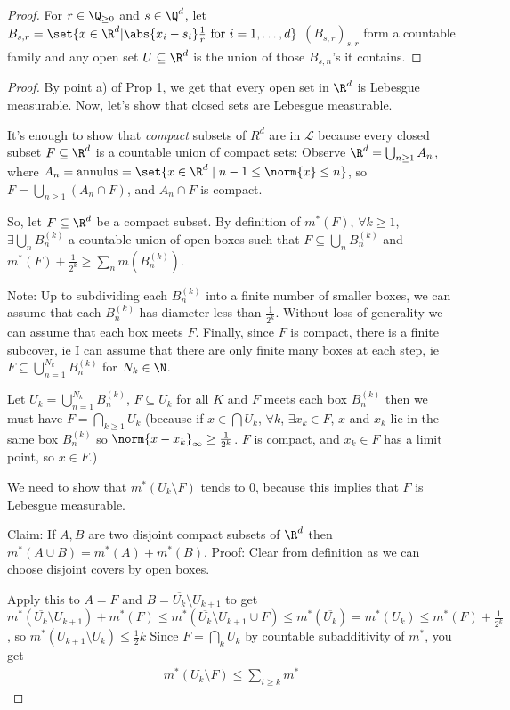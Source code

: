 \documentclass{article}
\newcommand{\1}[1]{\mathbbm{1}_{#1}}
\begin{document}
\begin{proof}
    For $r \in \Q_{\geq 0}$ and $s \in \Q^d$, let $B_{s, r} = \set{x \in \R^d | \abs{x_i - s_i} \frac1r \ \text{for} \ i=1,\dotsc,d}$
    $(B_{s,r})_{s,r}$ form a countable family and any open set $U \subseteq \R^d$ is the union of those $B_{s,n}$'s it contains.
\end{proof}

\begin{proof} %
    By point a) of Prop 1, we get that every open set in $\R^d$ is Lebesgue measurable. Now, let's show that closed sets are Lebesgue measurable.

    It's enough to show that \emph{compact} subsets of $R^d$ are in $\mathcal{L}$ because every closed subset $F \subseteq \R^d$ is a countable union of compact sets:
    Observe $\R^d = \bigcup_{n \geq 1} A_n$, where $A_n = \text{annulus} = \set{x \in \R^d \mid n-1 \leq \norm{x} \leq n}$, so $F = \bigcup_{n \geq 1} (A_n \cap F)$, and $A_n \cap F$ is compact.

    So, let $F \subseteq \R^d$ be a compact subset. By definition of $m^*(F)$, $\forall k \geq 1$, $\exists \bigcup_n B_n^{(k)}$ a countable union of open boxes such that $F \subseteq \bigcup_n B_n^{(k)}$ and $m^*(F) + \frac{1}{2^k} \geq \sum_n m(B_n^{(k)})$.

    Note: Up to subdividing each $B_n^{(k)}$ into a finite number of smaller boxes, we can assume that each $B_n^{(k)}$ has diameter less than $\frac{1}{2^k}$.
    Without loss of generality we can assume that each box meets $F$.
    Finally, since $F$ is compact, there is a finite subcover, ie I can assume that there are only finite many boxes at each step, ie $F \subseteq \bigcup_{n=1}^{N_k} B_n^{(k)}$ for $N_k \in \N$.

    Let $U_k = \bigcup_{n=1}^{N_k} B_n^{(k)}$, $F \subseteq U_k$ for all $K$ and $F$ meets each box $B_n^{(k)}$ then we must have $F = \bigcap_{k \geq 1} U_k$ (because if $x \in \bigcap U_k$, $\forall k$, $\exists x_k \in F$, $x$ and $x_k$ lie in the same box $B_n^{(k)}$ so $\norm{x - x_k}_\infty \geq \frac1{2^k}$.  $F$ is compact, and $x_k \in F$ has a limit point, so $x \in F$.)

    We need to show that $m^*(U_k \setminus F)$ tends to $0$, because this implies that $F$ is Lebesgue measurable.

    Claim: If $A, B$ are two disjoint compact subsets of $\R^d$ then $m^*(A \cup B) = m^*(A) + m^*(B)$. Proof: Clear from definition as we can choose disjoint covers by open boxes.

    Apply this to $A = F$ and $B = \overline{U_k} \setminus U_{k+1}$ to get $m^*(\overline{U_k} \setminus U_{k+1}) + m^*(F) \leq m^*(\overline{U_k} \setminus U_{k+1} \cup F) \leq m^*(\overline{U_k}) = m^*(U_k) \leq m^*(F) + \frac1{2^k}$, so $m^*(U_{k+1} \setminus U_k) \leq \frac12 k$
    Since $F = \bigcap_k U_k$ by countable subadditivity of $m^*$, you get
    \begin{align}
        m^*(U_k \setminus F) \leq \sum_{i \geq k} m^*
    \end{align}
\end{proof}
\end{document}
